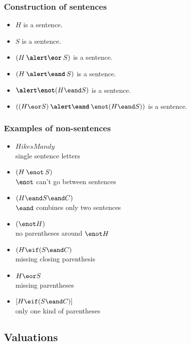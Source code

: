 \begin{frame}
  \frametitle{Construction of sentences}

  \begin{itemize}[<+->]
    \item $H$ is a sentence.
    \item $S$ is a sentence.
    \item $(H \mathbin{\emph{\eor}} S)$ is a sentence.
    \item $(H \mathbin{\emph{\eand}} S)$ is a sentence.
    \item $\emph{\enot} (H \eand S)$ is a sentence.
    \item $((H \eor S) \mathbin{\emph{\eand}} \enot (H \eand S))$ is a sentence.
  \end{itemize}


\end{frame}

\begin{frame}
  \frametitle{Examples of non-sentences}

  \begin{itemize}
    \item $\mathit{HikesMandy}$\\
    \qquad single sentence letters
    \item $(H \mathbin{\enot} S)$\\
    \qquad$\enot$ can't go between sentences
    \item $(H \eand S \eand C)$\\
    \qquad $\eand$ combines only two sentences
    \item $(\enot H)$\\
    \qquad no parentheses around $\enot H$
    \item $(H \eif (S \eand C)$\\
    \qquad missing closing parenthesis
    \item $H \eor S$\\
    \qquad missing parentheses
    \item $[H \eif (S \eand C)]$\\
    \qquad only one kind of parentheses
  \end{itemize}

\end{frame}

\subsection{Valuations}

